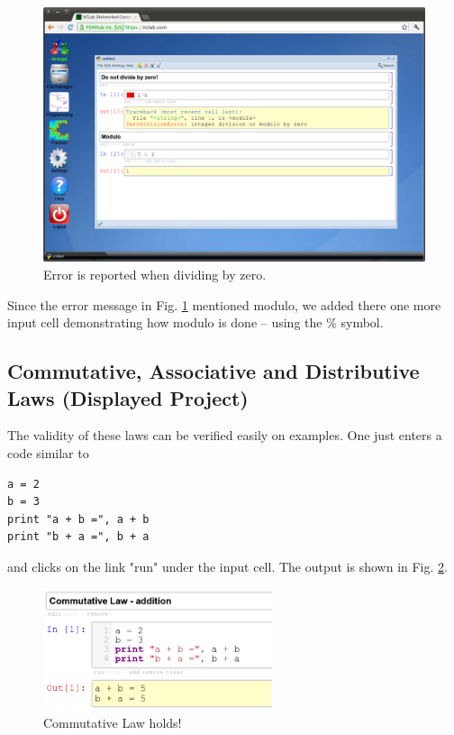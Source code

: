 \documentclass[article,A4,12pt]{llncs}
\begin{document}
\newpage
\begin{figure}[!ht]
\begin{center}
\includegraphics[width=\textwidth]{img/divzero.png}
\end{center}
\caption{Error is reported when dividing by zero.}
\label{fig:divzero}
\end{figure}
\noindent
Since the error message in Fig. \ref{fig:divzero} mentioned modulo, we added there one more 
input cell demonstrating how modulo is done -- using the \% symbol.

\subsection{Commutative, Associative and Distributive Laws (Displayed Project)}

The validity of these laws can be verified easily on examples. One just enters
a code similar to 

\begin{verbatim}
a = 2
b = 3
print "a + b =", a + b
print "b + a =", b + a
\end{verbatim}
and clicks on the link "run" under the input cell. The output 
is shown in Fig. \ref{fig:commut}. 

\begin{figure}[!ht]
\begin{center}
\includegraphics[width=0.6\textwidth]{img/commut.png}
\end{center}
\vspace{-4mm}
\caption{Commutative Law holds!}
\label{fig:commut}
\end{figure}
\end{document}
